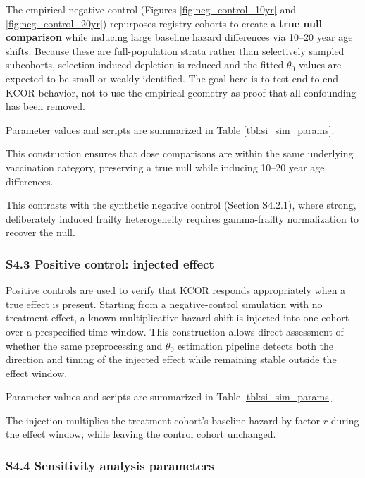 \documentclass[
]{article}
\begin{document}
The empirical negative control (Figures \ref{fig:neg_control_10yr} and
\ref{fig:neg_control_20yr}) repurposes registry cohorts to create a
\textbf{true null comparison} while inducing large baseline hazard
differences via 10--20 year age shifts. Because these are
full-population strata rather than selectively sampled subcohorts,
selection-induced depletion is reduced and the fitted \(\theta_0\)
values are expected to be small or weakly identified. The goal here is
to test end-to-end KCOR behavior, not to use the empirical geometry as
proof that all confounding has been removed.

Parameter values and scripts are summarized in Table
\ref{tbl:si_sim_params}.

This construction ensures that dose comparisons are within the same
underlying vaccination category, preserving a true null while inducing
10--20 year age differences.

This contrasts with the synthetic negative control (Section S4.2.1),
where strong, deliberately induced frailty heterogeneity requires
gamma-frailty normalization to recover the null.

\subsubsection{S4.3 Positive control: injected
effect}\label{s4.3-positive-control-injected-effect}

Positive controls are used to verify that KCOR responds appropriately
when a true effect is present. Starting from a negative-control
simulation with no treatment effect, a known multiplicative hazard shift
is injected into one cohort over a prespecified time window. This
construction allows direct assessment of whether the same preprocessing
and \(\theta_0\) estimation pipeline detects both the direction and
timing of the injected effect while remaining stable outside the effect
window.

Parameter values and scripts are summarized in Table
\ref{tbl:si_sim_params}.

The injection multiplies the treatment cohort's baseline hazard by
factor \(r\) during the effect window, while leaving the control cohort
unchanged.

\subsubsection{S4.4 Sensitivity analysis
parameters}\label{s4.4-sensitivity-analysis-parameters}
\end{document}
